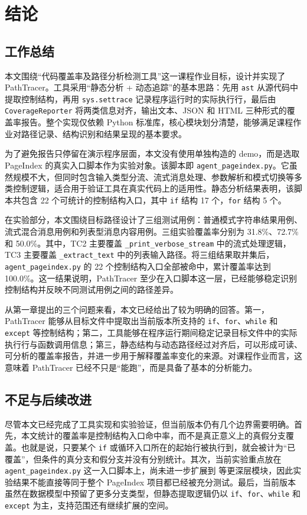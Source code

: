 \chapter{结论}
\label{cha:conclusion}

\section*{工作总结}

本文围绕“代码覆盖率及路径分析检测工具”这一课程作业目标，设计并实现了 PathTracer。工具采用“静态分析 + 动态追踪”的基本思路：先用 \texttt{ast} 从源代码中提取控制结构，再用 \texttt{sys.settrace} 记录程序运行时的实际执行行，最后由 \texttt{CoverageReporter} 将两类信息对齐，输出文本、JSON 和 HTML 三种形式的覆盖率报告。整个实现仅依赖 Python 标准库，核心模块划分清楚，能够满足课程作业对路径记录、结构识别和结果呈现的基本要求。

为了避免报告只停留在演示程序层面，本文没有使用单独构造的 demo，而是选取 PageIndex 的真实入口脚本作为实验对象。该脚本即 \texttt{agent\_pageindex.py}。它虽然规模不大，但同时包含输入类型分流、流式消息处理、参数解析和模式切换等多类控制逻辑，适合用于验证工具在真实代码上的适用性。静态分析结果表明，该脚本共包含 22 个可统计的控制结构入口，其中 \texttt{if} 结构 17 个，\texttt{for} 结构 5 个。

在实验部分，本文围绕目标路径设计了三组测试用例：普通模式字符串结果用例、流式混合消息用例和列表型消息内容用例。三组实验覆盖率分别为 31.8\%、72.7\% 和 50.0\%。其中，TC2 主要覆盖 \texttt{\_print\_verbose\_stream} 中的流式处理逻辑，TC3 主要覆盖 \texttt{\_extract\_text} 中的列表输入路径。将三组结果取并集后，\texttt{agent\_pageindex.py} 的 22 个控制结构入口全部被命中，累计覆盖率达到 100.0\%。这一结果说明，PathTracer 至少在入口脚本这一层，已经能够稳定识别控制结构并反映不同测试用例之间的路径差异。

从第一章提出的三个问题来看，本文已经给出了较为明确的回答。第一，PathTracer 能够从目标文件中提取出当前版本所支持的 \texttt{if}、\texttt{for}、\texttt{while} 和 \texttt{except} 等控制结构；第二，工具能够在程序运行期间稳定记录目标文件中的实际执行行与函数调用信息；第三，静态结构与动态路径经过对齐后，可以形成可读、可分析的覆盖率报告，并进一步用于解释覆盖率变化的来源。对课程作业而言，这意味着 PathTracer 已经不只是“能跑”，而是具备了基本的分析能力。

\section*{不足与后续改进}

尽管本文已经完成了工具实现和实验验证，但当前版本仍有几个边界需要明确。首先，本文统计的覆盖率是控制结构入口命中率，而不是真正意义上的真假分支覆盖。也就是说，只要某个 \texttt{if} 或循环入口所在的起始行被执行到，就会被计为“已覆盖”，但条件的真分支和假分支并没有分别统计。其次，当前实验重点放在 \texttt{agent\_pageindex.py} 这一入口脚本上，尚未进一步扩展到  等更深层模块，因此实验结果不能直接等同于整个 PageIndex 项目都已经被充分测试。最后，当前版本虽然在数据模型中预留了更多分支类型，但静态提取逻辑仍以 \texttt{if}、\texttt{for}、\texttt{while} 和 \texttt{except} 为主，支持范围还有继续扩展的空间。

